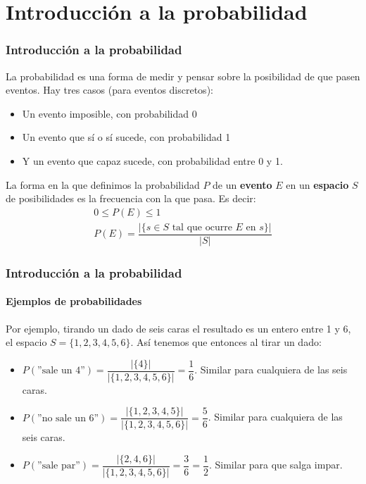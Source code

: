 \documentclass[../main.tex]{subfiles}
\begin{document}
\newcommand{\SECTIONA}{Introducción a la probabilidad}
\section{\SECTIONA}

\begin{frame}
  \frametitle{\SECTIONA}

  La probabilidad es una forma de medir y pensar sobre la posibilidad de que pasen eventos. \pause Hay tres casos (para eventos discretos):
  \begin{itemize}
    \item<2-> Un evento imposible, con probabilidad 0
    \item<3-> Un evento que sí o sí sucede, con probabilidad 1
    \item<4-> Y un evento que capaz sucede, con probabilidad entre 0 y 1.
  \end{itemize} \pause \pause \pause %
  La forma en la que definimos la probabilidad \(P\) de un \textbf{evento} \(E\) en un \textbf{espacio} \(S\) de posibilidades es la frecuencia con la que pasa. Es decir:
  \begin{gather*}
    0 \leq P(E) \leq 1 \\
    P(E) = \dfrac{|\{s \in S \text{ tal que ocurre } E \text{ en } s\}|}{|S|}
  \end{gather*}
\end{frame}

\begin{frame}
  \frametitle{\SECTIONA}
  \framesubtitle{Ejemplos de probabilidades}

  Por ejemplo, tirando un dado de seis caras el resultado es un entero entre 1 y 6, el espacio \(S = \{1, 2, 3, 4, 5, 6\}\). \pause Así tenemos que entonces al tirar un dado:
  \begin{itemize}
    \item<2-> \(P(\text{''sale un 4''}) = \dfrac{|\{4\}|}{|\{1, 2, 3, 4, 5, 6\}|} = \dfrac{1}{6}\). Similar para cualquiera de las seis caras.
    \item<3-> \(P(\text{''no sale un 6''}) = \dfrac{|\{1, 2, 3, 4, 5\}|}{|\{1, 2, 3, 4, 5, 6\}|} = \dfrac{5}{6}\). Similar para cualquiera de las seis caras.
    \item<4-> \(P(\text{''sale par''}) = \dfrac{|\{2, 4, 6\}|}{|\{1, 2, 3, 4, 5, 6\}|} = \dfrac{3}{6} = \dfrac{1}{2}\). Similar para que salga impar.
  \end{itemize}
\end{frame}
\end{document}
